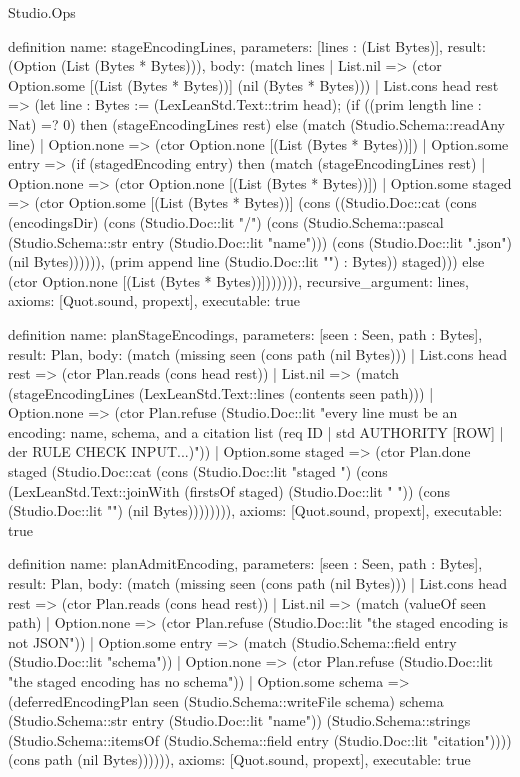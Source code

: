 \begin{lexlean}{Studio.Ops}
\begin{semanticmodule}
{definition{
  name: stageEncodingLines,
  parameters: [lines : (List Bytes)],
  result: (Option (List (Bytes * Bytes))),
  body: (match lines
    | List.nil => (ctor Option.some [(List (Bytes * Bytes))] (nil (Bytes * Bytes)))
    | List.cons head rest => (let line : Bytes := (LexLeanStd.Text::trim head); (if ((prim length line : Nat) =? 0) then (stageEncodingLines rest) else (match (Studio.Schema::readAny line)
      | Option.none => (ctor Option.none [(List (Bytes * Bytes))])
      | Option.some entry => (if (stagedEncoding entry) then (match (stageEncodingLines rest)
        | Option.none => (ctor Option.none [(List (Bytes * Bytes))])
        | Option.some staged => (ctor Option.some [(List (Bytes * Bytes))] (cons ((Studio.Doc::cat (cons (encodingsDir) (cons (Studio.Doc::lit "/") (cons (Studio.Schema::pascal (Studio.Schema::str entry (Studio.Doc::lit "name"))) (cons (Studio.Doc::lit ".json") (nil Bytes)))))), (prim append line (Studio.Doc::lit "\n") : Bytes)) staged))) else (ctor Option.none [(List (Bytes * Bytes))])))))),
  recursive_argument: lines,
  axioms: [Quot.sound, propext],
  executable: true
}

definition{
  name: planStageEncodings,
  parameters: [seen : Seen, path : Bytes],
  result: Plan,
  body: (match (missing seen (cons path (nil Bytes)))
    | List.cons head rest => (ctor Plan.reads (cons head rest))
    | List.nil => (match (stageEncodingLines (LexLeanStd.Text::lines (contents seen path)))
      | Option.none => (ctor Plan.refuse (Studio.Doc::lit "every line must be an encoding: name, schema, and a citation list (req ID | std AUTHORITY [ROW] | der RULE CHECK INPUT...)\n"))
      | Option.some staged => (ctor Plan.done staged (Studio.Doc::cat (cons (Studio.Doc::lit "staged ") (cons (LexLeanStd.Text::joinWith (firstsOf staged) (Studio.Doc::lit " ")) (cons (Studio.Doc::lit "\n") (nil Bytes)))))))),
  axioms: [Quot.sound, propext],
  executable: true
}

definition{
  name: planAdmitEncoding,
  parameters: [seen : Seen, path : Bytes],
  result: Plan,
  body: (match (missing seen (cons path (nil Bytes)))
    | List.cons head rest => (ctor Plan.reads (cons head rest))
    | List.nil => (match (valueOf seen path)
      | Option.none => (ctor Plan.refuse (Studio.Doc::lit "the staged encoding is not JSON\n"))
      | Option.some entry => (match (Studio.Schema::field entry (Studio.Doc::lit "schema"))
        | Option.none => (ctor Plan.refuse (Studio.Doc::lit "the staged encoding has no schema\n"))
        | Option.some schema => (deferredEncodingPlan seen (Studio.Schema::writeFile schema) schema (Studio.Schema::str entry (Studio.Doc::lit "name")) (Studio.Schema::strings (Studio.Schema::itemsOf (Studio.Schema::field entry (Studio.Doc::lit "citation")))) (cons path (nil Bytes)))))),
  axioms: [Quot.sound, propext],
  executable: true
}




}
\end{semanticmodule}
\end{lexlean}
